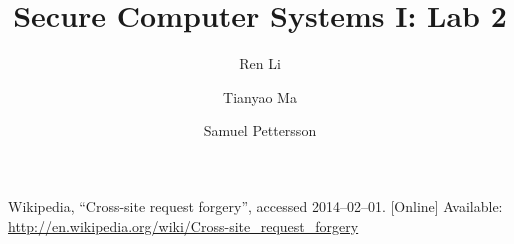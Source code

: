\documentclass{article}
\title{\textbf{Secure Computer Systems I: Lab 2}}
\author{Ren Li \and Tianyao Ma \and Samuel Pettersson}
\begin{document}
\maketitle





\begin{thebibliography}{9}
  Wikipedia,
  ``Cross-site request forgery'',
  accessed 2014--02--01.
  [Online]
  Available: \url{http://en.wikipedia.org/wiki/Cross-site_request_forgery}
\end{thebibliography}
\end{document}
